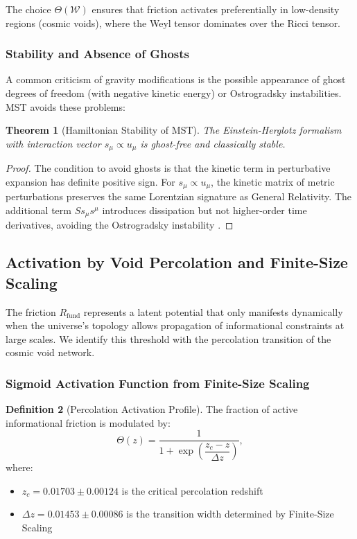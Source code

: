 \documentclass[11pt, a4paper]{article}
\theoremstyle{plain}
\newtheorem{theorem}{Theorem}[section]
\theoremstyle{definition}
\newtheorem{definition}[theorem]{Definition}
\newcommand{\Rfactor}{R_{\text{fund}}}
\begin{document}
The choice $\Theta(\mathcal{W})$ ensures that friction activates preferentially in low-density regions (cosmic voids), where the Weyl tensor dominates over the Ricci tensor.

\subsubsection{Stability and Absence of Ghosts}

A common criticism of gravity modifications is the possible appearance of ghost degrees of freedom (with negative kinetic energy) or Ostrogradsky instabilities. MST avoids these problems:

\begin{theorem}[Hamiltonian Stability of MST]
The Einstein-Herglotz formalism with interaction vector $s_\mu \propto u_\mu$ is ghost-free and classically stable.
\end{theorem}

\begin{proof}
The condition to avoid ghosts is that the kinetic term in perturbative expansion has definite positive sign. For $s_\mu \propto u_\mu$, the kinetic matrix of metric perturbations preserves the same Lorentzian signature as General Relativity. The additional term $S s_\mu s^\mu$ introduces dissipation but not higher-order time derivatives, avoiding the Ostrogradsky instability \cite{Lazo2017}.
\end{proof}

\subsection{Activation by Void Percolation and Finite-Size Scaling}

The friction $\Rfactor$ represents a latent potential that only manifests dynamically when the universe's topology allows propagation of informational constraints at large scales. We identify this threshold with the percolation transition of the cosmic void network.

\subsubsection{Sigmoid Activation Function from Finite-Size Scaling}

\begin{definition}[Percolation Activation Profile]
The fraction of active informational friction is modulated by:
\begin{equation}
\Theta(z) = \frac{1}{1 + \exp\left(\dfrac{z_c - z}{\Delta z}\right)},
\label{eq:activation_function}
\end{equation}
where:
\begin{itemize}
    \item $z_c = 0.01703 \pm 0.00124$ is the critical percolation redshift
    \item $\Delta z = 0.01453 \pm 0.00086$ is the transition width determined by Finite-Size Scaling
\end{itemize}
\end{definition}
\end{document}
